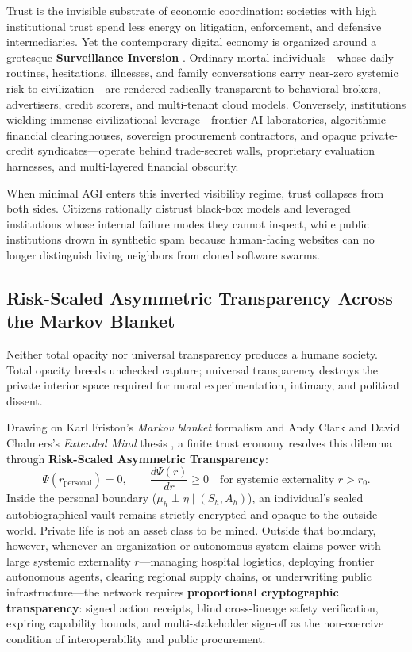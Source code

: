 \documentclass[11pt]{article}
\begin{document}
Trust is the invisible substrate of economic coordination: societies with high institutional trust spend less energy on litigation, enforcement, and defensive intermediaries. Yet the contemporary digital economy is organized around a grotesque \textbf{Surveillance Inversion} \citep{zuboff2019surveillance, balkin2016fiduciaries}. Ordinary mortal individuals---whose daily routines, hesitations, illnesses, and family conversations carry near-zero systemic risk to civilization---are rendered radically transparent to behavioral brokers, advertisers, credit scorers, and multi-tenant cloud models. Conversely, institutions wielding immense civilizational leverage---frontier AI laboratories, algorithmic financial clearinghouses, sovereign procurement contractors, and opaque private-credit syndicates---operate behind trade-secret walls, proprietary evaluation harnesses, and multi-layered financial obscurity.

When minimal AGI enters this inverted visibility regime, trust collapses from both sides. Citizens rationally distrust black-box models and leveraged institutions whose internal failure modes they cannot inspect, while public institutions drown in synthetic spam because human-facing websites can no longer distinguish living neighbors from cloned software swarms.

\subsection{Risk-Scaled Asymmetric Transparency Across the Markov Blanket}

Neither total opacity nor universal transparency produces a humane society. Total opacity breeds unchecked capture; universal transparency destroys the private interior space required for moral experimentation, intimacy, and political dissent.

Drawing on Karl Friston's \emph{Markov blanket} formalism \citep{friston2013life} and Andy Clark and David Chalmers's \emph{Extended Mind} thesis \citep{clark1998extended}, a finite trust economy resolves this dilemma through \textbf{Risk-Scaled Asymmetric Transparency}:
\begin{equation}
  \Psi(r_{\mathrm{personal}}) = 0, \qquad \frac{d\Psi(r)}{dr} \ge 0 \quad \text{for systemic externality } r > r_0.
  \label{eq:asymmetric}
\end{equation}
Inside the personal boundary ($\mu_h \perp \eta \mid (S_h, A_h)$), an individual's sealed autobiographical vault remains strictly encrypted and opaque to the outside world. Private life is not an asset class to be mined. Outside that boundary, however, whenever an organization or autonomous system claims power with large systemic externality $r$---managing hospital logistics, deploying frontier autonomous agents, clearing regional supply chains, or underwriting public infrastructure---the network requires \textbf{proportional cryptographic transparency}: signed action receipts, blind cross-lineage safety verification, expiring capability bounds, and multi-stakeholder sign-off as the non-coercive condition of interoperability and public procurement.
\end{document}
